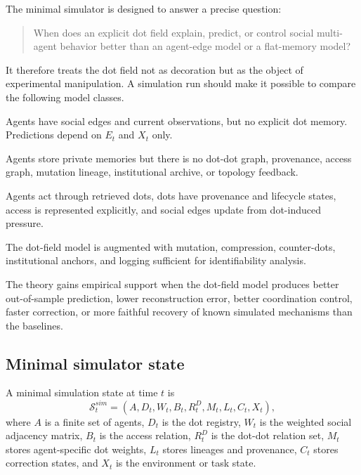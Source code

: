 \documentclass[11pt]{article}
\theoremstyle{remark}
\begin{document}
The minimal simulator is designed to answer a precise question:

\begin{quote}
When does an explicit dot field explain, predict, or control social
multi-agent behavior better than an agent-edge model or a flat-memory
model?
\end{quote}

It therefore treats the dot field not as decoration but as the object of
experimental manipulation. A simulation run should make it possible to
compare the following model classes.

\begin{description}[leftmargin=3.2cm,style=nextline]
\item[Edge-only baseline]
Agents have social edges and current observations, but no explicit dot
memory. Predictions depend on $E_t$ and $X_t$ only.

\item[Flat-memory baseline]
Agents store private memories but there is no dot-dot graph, provenance,
access graph, mutation lineage, institutional archive, or topology
feedback.

\item[Dot-field model]
Agents act through retrieved dots, dots have provenance and lifecycle
states, access is represented explicitly, and social edges update from
dot-induced pressure.

\item[Full dot-field model]
The dot-field model is augmented with mutation, compression,
counter-dots, institutional anchors, and logging sufficient for
identifiability analysis.
\end{description}

The theory gains empirical support when the dot-field model produces
better out-of-sample prediction, lower reconstruction error, better
coordination control, faster correction, or more faithful recovery of
known simulated mechanisms than the baselines.

\subsection{Minimal simulator state}\label{minimal-simulator-state}

A minimal simulation state at time $t$ is
$$
\mathcal S_t^{sim}=(A,D_t,W_t,B_t,R_t^D,M_t,L_t,C_t,X_t),
$$
where $A$ is a finite set of agents, $D_t$ is the dot registry, $W_t$ is
the weighted social adjacency matrix, $B_t$ is the access relation,
$R_t^D$ is the dot-dot relation set, $M_t$ stores agent-specific dot
weights, $L_t$ stores lineages and provenance, $C_t$ stores correction
states, and $X_t$ is the environment or task state.
\end{document}
